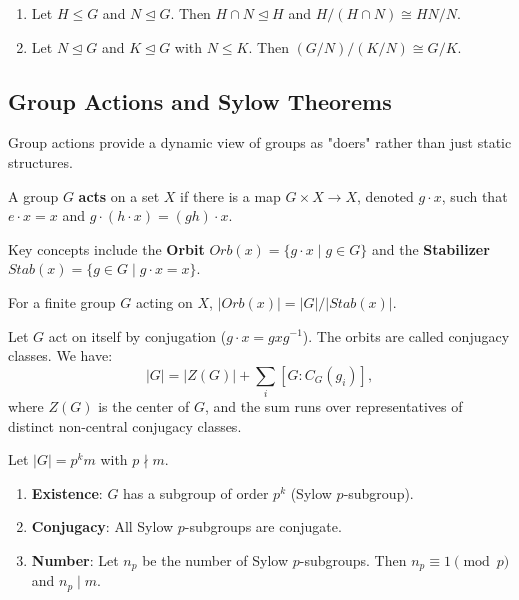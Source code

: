\begin{theorem}
\begin{enumerate}
    \item Let $H \leq G$ and $N \trianglelefteq G$. Then $H \cap N \trianglelefteq H$ and $H/(H \cap N) \cong HN/N$.
    \item Let $N \trianglelefteq G$ and $K \trianglelefteq G$ with $N \leq K$. Then $(G/N)/(K/N) \cong G/K$.
\end{enumerate}
\end{theorem}

\subsection{Group Actions and Sylow Theorems}

Group actions provide a dynamic view of groups as "doers" rather than just static structures.

\begin{definition}
A group $G$ \textbf{acts} on a set $X$ if there is a map $G \times X \to X$, denoted $g \cdot x$, such that $e \cdot x = x$ and $g \cdot (h \cdot x) = (gh) \cdot x$.
\end{definition}

Key concepts include the \textbf{Orbit} $Orb(x) = \{g \cdot x \mid g \in G\}$ and the \textbf{Stabilizer} $Stab(x) = \{g \in G \mid g \cdot x = x\}$.

\begin{theorem}
For a finite group $G$ acting on $X$, $|Orb(x)| = |G| / |Stab(x)|$.
\end{theorem}

\begin{theorem}
Let $G$ act on itself by conjugation ($g \cdot x = gxg^{-1}$). The orbits are called conjugacy classes. We have:
\[ |G| = |Z(G)| + \sum_{i} [G : C_G(g_i)], \]
where $Z(G)$ is the center of $G$, and the sum runs over representatives of distinct non-central conjugacy classes.
\end{theorem}

\begin{theorem}
Let $|G| = p^k m$ with $p \nmid m$.
\begin{enumerate}
    \item \textbf{Existence}: $G$ has a subgroup of order $p^k$ (Sylow $p$-subgroup).
    \item \textbf{Conjugacy}: All Sylow $p$-subgroups are conjugate.
    \item \textbf{Number}: Let $n_p$ be the number of Sylow $p$-subgroups. Then $n_p \equiv 1 \pmod p$ and $n_p \mid m$.
\end{enumerate}
\end{theorem}

